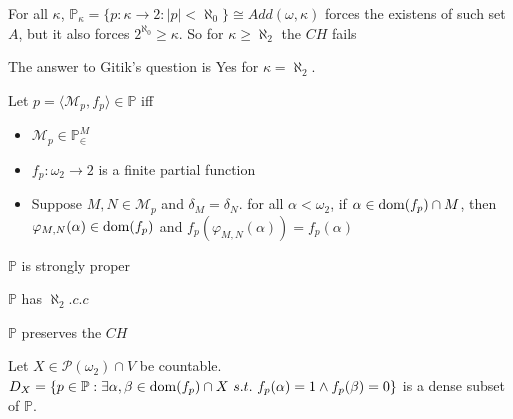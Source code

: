 \documentclass[10pt]{beamer}
\newcommand{\dom}{{\rm dom}}
\begin{document}
\begin{frame}
For all $\kappa$, $\mathbb{P}_{\kappa}=\{p: \kappa \longrightarrow 2 : |p| < \aleph_0\} \cong Add(\omega, \kappa)$ forces the existens of such set $A$, but it also forces $2^{\aleph_0} \geq \kappa$. So for $\kappa \geq \aleph_2$ the $CH$ fails
\begin{theorem}
The answer to Gitik's question is Yes for $\kappa=\aleph_2$.
\end{theorem}
\begin{definition}
Let $p= \langle \mathcal{M}_p, f_p \rangle \in \mathbb{P}$ iff
\begin{itemize}
\item $\mathcal{M}_p \in \mathbb{P}_{\in}^M$
\item $f_p : \omega_2 \longrightarrow 2$ is a finite partial function
\item Suppose $M, N \in \mathcal{M}_p$ and $\delta_M = \delta_N$. for all $\alpha < \omega_2$, if $\alpha \in \dom(f_p) \cap M$, then $\varphi_{M,N}(\alpha) \in \dom(f_p)$ and $f_p(\varphi_{M,N}(\alpha))= f_p(\alpha)$
\end{itemize}
\end{definition}
\end{frame}
\begin{frame}
\begin{theorem}
$\mathbb{P}$ is strongly proper
\end{theorem}
\begin{theorem}
$\mathbb{P}$ has $\aleph_2.c.c$
\end{theorem}
\begin{theorem}
$\mathbb{P}$ preserves the $CH$
\end{theorem}
Let $X \in \mathcal{P}(\omega_2) \cap V$ be countable. $D_X=\{p \in \mathbb{P} : \exists \alpha, \beta \in \dom(f_p) \cap X \ s.t. \ f_p(\alpha)=1 \land f_p(\beta)=0\}$ is a dense subset of $\mathbb{P}$.
\end{frame}
\end{document}

